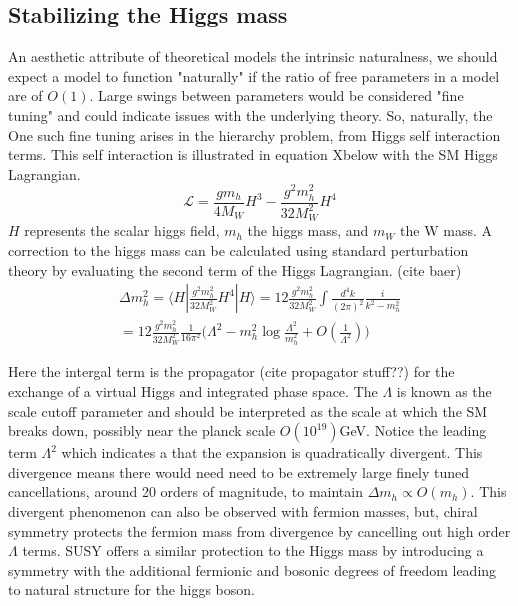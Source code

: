 \subsection{Stabilizing the Higgs mass}

An aesthetic attribute of theoretical models the intrinsic naturalness, we should expect a model to function "naturally" if the ratio of free parameters in a model are of $O(1)$. Large swings between parameters would be considered "fine tuning" and could indicate issues with the underlying theory. So, naturally, the %
One such fine tuning arises in the hierarchy problem, from Higgs self interaction terms. This self interaction is illustrated in equation Xbelow with the SM Higgs Lagrangian.
\begin{equation}
\mathcal{L}=\frac{gm_h}{4M_W}H^3 - \frac{g^2m_h^2}{32M_W^2}H^4
\end{equation}
$H$ represents the scalar higgs field, $m_h$ the higgs mass, and $m_W$ the W mass. A correction to the higgs mass can be calculated using standard perturbation theory by evaluating the second term of the Higgs Lagrangian. (cite baer)
\begin{equation}
\begin{split}
\Delta m_h^2 = \langle H | \frac{g^2m_h^2}{32M_W^2} H^4 | H  \rangle = 12\frac{g^2m_h^2}{32M_W^2}\int \frac{d^4 k}{(2\pi)^2} \frac{i}{k^2 - m_h^2}\\
= 12\frac{g^2m_h^2}{32M_W^2} \frac{1}{16\pi^2}\big( \Lambda^2 - m_h^2\log\frac{\Lambda^2}{m_h^2} + O(\frac{1}{\Lambda^2})\big)
\end{split} 
\end{equation}
 
 Here the intergal term is the propagator (cite propagator stuff??) for the exchange of a virtual Higgs and integrated phase space. The $\Lambda$ is known as the scale cutoff parameter and should be interpreted as the scale at which the SM breaks down, possibly near the planck scale $O(10^{19})$GeV. Notice the leading term $\Lambda^2$ which indicates a that the expansion is quadratically divergent. This divergence means there would need need to be extremely large finely tuned cancellations, around 20 orders of magnitude, to maintain $\Delta m_h \propto O(m_h)$. This divergent phenomenon can also be observed with fermion masses, but, chiral symmetry protects the fermion mass from divergence by cancelling out high order $\Lambda$ terms. SUSY offers a similar protection to the Higgs mass by introducing a symmetry with the additional fermionic and bosonic degrees of freedom leading to natural structure for the higgs boson. 



